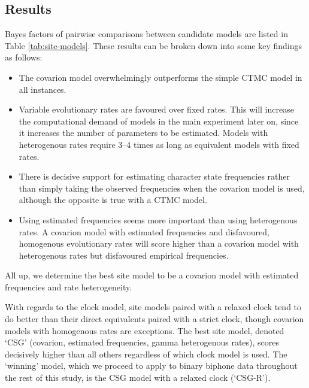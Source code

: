 \documentclass[]{article}
\providecommand{\tightlist}{%
  \setlength{\itemsep}{0pt}\setlength{\parskip}{0pt}}
\begin{document}
\hypertarget{results-prelim-1}{%
\subsection{Results}\label{results-prelim-1}}

Bayes factors of pairwise comparisons between candidate models are listed in Table \ref{tab:site-models}. These results can be broken down into some key findings as follows:

\begin{itemize}
\tightlist
\item
  The covarion model overwhelmingly outperforms the simple CTMC model in all instances.
\item
  Variable evolutionary rates are favoured over fixed rates. This will increase the computational demand of models in the main experiment later on, since it increases the number of parameters to be estimated. Models with heterogenous rates require 3--4 times as long as equivalent models with fixed rates.
\item
  There is decisive support for estimating character state frequencies rather than simply taking the observed frequencies when the covarion model is used, although the opposite is true with a CTMC model.
\item
  Using estimated frequencies seems more important than using heterogenous rates. A covarion model with estimated frequencies and disfavoured, homogenous evolutionary rates will score higher than a covarion model with heterogenous rates but disfavoured empirical frequencies.
\end{itemize}

All up, we determine the best site model to be a covarion model with estimated frequencies and rate heterogeneity.

With regards to the clock model, site models paired with a relaxed clock tend to do better than their direct equivalents paired with a strict clock, though covarion models with homogenous rates are exceptions. The best site model, denoted `CSG' (covarion, estimated frequencies, gamma heterogenous rates), scores decisively higher than all others regardless of which clock model is used. The `winning' model, which we proceed to apply to binary biphone data throughout the rest of this study, is the CSG model with a relaxed clock (`CSG-R').
\end{document}
